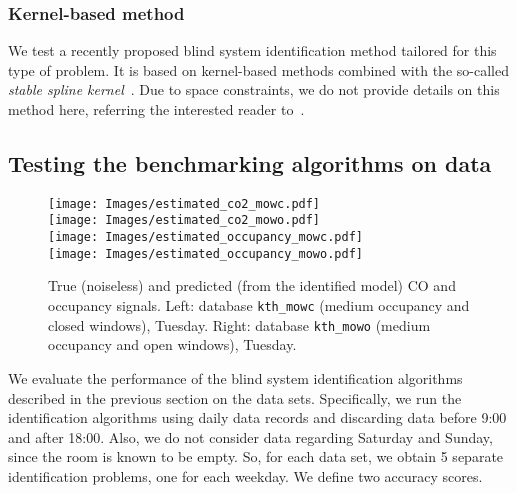\documentclass{article}
\begin{document}
\subsubsection{Kernel-based method}
We test a recently proposed blind system identification method tailored for
this type of problem. It is based on kernel-based methods combined with the
so-called \emph{stable spline kernel}~\cite{pillonetto2014kernel}. Due to
space constraints, we do not provide details on this method here, referring the
interested reader to~\cite{bottegal2015blind}.



\subsection{Testing the benchmarking algorithms on data}
\begin{figure*}[htb]\label{fig:co2_test}
\centering
\texttt{[image: Images/estimated\_co2\_mowc.pdf]}\\
\texttt{[image: Images/estimated\_co2\_mowo.pdf]}\\
\texttt{[image: Images/estimated\_occupancy\_mowc.pdf]}\\
\texttt{[image: Images/estimated\_occupancy\_mowo.pdf]}
\caption{True (noiseless) and predicted (from the identified model) CO and occupancy signals. Left: database \texttt{kth\_mowc} (medium occupancy and closed windows), Tuesday. Right: database \texttt{kth\_mowo} (medium occupancy and open windows), Tuesday.}
\label{fig:room_CO2_concentration}
\end{figure*}
We evaluate the performance of the blind system identification algorithms described in the previous section on the data sets. Specifically, we run the identification algorithms using daily data records and discarding data before 9:00 and after 18:00. Also, we do not consider data regarding Saturday and Sunday, since the room is known to be empty. So, for each data set, we obtain 5 separate identification problems, one for each weekday. We define two accuracy scores.
\end{document}
